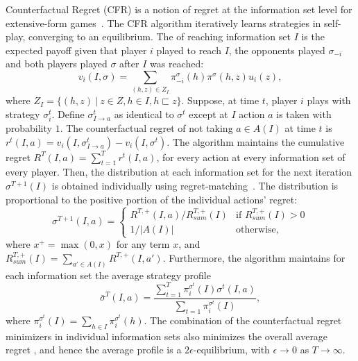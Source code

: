 \documentclass{aamas2015}
\newcommand{\defword}[1]{\textbf{\boldmath{#1}}}
\begin{document}
Counterfactual Regret (CFR) is a notion of regret at the information set level for extensive-form games~\cite{CFR}. 
The CFR algorithm iteratively learns strategies in self-play, converging to an equilibrium. 
The \defword{counterfactual value} of reaching information set $I$ is the expected payoff given that player $i$ played to reach $I$, the opponents played 
$\sigma_{-i}$ and both players played $\sigma$ after $I$ was reached:
\begin{equation}
\label{eq:cfv}
v_i(I,\sigma) = \sum_{(h,z) \in Z_I} \pi^{\sigma}_{-i}(h) \pi^{\sigma}(h,z) u_i(z), 
\end{equation}
where $Z_I = \{ (h,z)~|~z \in Z, h \in I, h \sqsubset z \}$.
Suppose, at time $t$, player $i$ plays with strategy $\sigma^t_i$. 
Define $\sigma^t_{I \rightarrow a}$ as identical to $\sigma^t$ except at $I$ action $a$ is taken with probability $1$. 
The counterfactual regret of not taking $a \in A(I)$ at time $t$ is $r^t(I,a) = v_i(I,\sigma^t_{I \rightarrow a}) - v_i(I,\sigma^t)$. 
The algorithm maintains the cumulative regret $R^T(I,a) = \sum_{t=1}^T r^t(I,a)$, for every action at every information set of every player. 
Then, the distribution at each information set for the next iteration $\sigma^{T+1}(I)$ is obtained individually using 
regret-matching~\cite{Hart00}. The distribution is proportional to the positive portion of the individual actions' regret:
\begin{equation*}
\label{eq:rm}
\sigma^{T+1}(I,a) = \left\{
\begin{array}{ll}
R^{T,+}(I,a) / R^{T,+}_{sum}(I) & \mbox{if } R^{T,+}_{sum}(I) > 0 \\ 
1 / |A(I)|                   & \mbox{otherwise,}
\end{array} \right.
\end{equation*}
where $x^+ = \max(0,x)$ for any term $x$, and $R^{T,+}_{sum}(I) = \sum_{a' \in A(I)} R^{T,+}(I,a')$. Furthermore, the algorithm maintains for each information set the average strategy profile
\begin{equation}
\bar{\sigma}^T(I,a) = \frac{\sum_{t=1}^T \pi^{\sigma^t}_i(I) \sigma^t(I,a)}{\sum_{t=1} \pi^{\sigma^t}_i(I)}, 
\end{equation}
where $\pi^{\sigma^t}_i(I) = \sum_{h \in I}\pi^{\sigma^t}_i(h)$.
The combination of the counterfactual regret minimizers in individual information sets also minimizes the overall average regret \cite{CFR}, and hence the average profile is a $2\epsilon$-equilibrium, with $\epsilon \rightarrow 0$
as $T \rightarrow \infty$.
\end{document}
